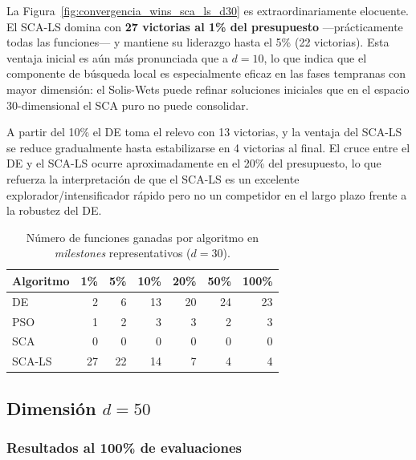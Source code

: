 \documentclass[12pt,a4paper]{article}
\begin{document}
La Figura~\ref{fig:convergencia_wins_sca_ls_d30} es extraordinariamente elocuente. El SCA-LS domina con \textbf{27 victorias al 1\% del presupuesto} ---prácticamente todas las funciones--- y mantiene su liderazgo hasta el 5\% (22 victorias). Esta ventaja inicial es aún más pronunciada que a $d=10$, lo que indica que el componente de búsqueda local es especialmente eficaz en las fases tempranas con mayor dimensión: el Solis-Wets puede refinar soluciones iniciales que en el espacio 30-dimensional el SCA puro no puede consolidar.

A partir del 10\% el DE toma el relevo con 13 victorias, y la ventaja del SCA-LS se reduce gradualmente hasta estabilizarse en 4 victorias al final. El cruce entre el DE y el SCA-LS ocurre aproximadamente en el 20\% del presupuesto, lo que refuerza la interpretación de que el SCA-LS es un excelente explorador/intensificador rápido pero no un competidor en el largo plazo frente a la robustez del DE.

\begin{table}[H]
\centering
\caption{Número de funciones ganadas por algoritmo en \textit{milestones} representativos ($d=30$).}
\label{tab:resumen_victorias_sca_ls_d30}
\renewcommand{\arraystretch}{1.2}
\begin{tabular}{lrrrrrr}
\toprule
\textbf{Algoritmo} & \textbf{1\%} & \textbf{5\%} & \textbf{10\%} & \textbf{20\%} & \textbf{50\%} & \textbf{100\%} \\
\midrule
DE      &  2 &  6 & 13 & 20 & 24 & 23 \\
PSO     &  1 &  2 &  3 &  3 &  2 &  3 \\
SCA     &  0 &  0 &  0 &  0 &  0 &  0 \\
SCA-LS  & 27 & 22 & 14 &  7 &  4 &  4 \\
\bottomrule
\end{tabular}
\end{table}

\subsection{Dimensión $d = 50$}

\subsubsection{Resultados al 100\% de evaluaciones}
\end{document}
